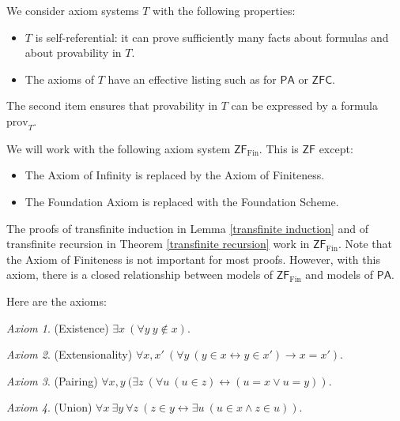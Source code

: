 \documentclass[a4paper, 11pt]{amsart}
\theoremstyle{remark}
\newtheorem*{axiom}{Axiom}
\newcommand{\axiomft}[1]{\mathsf{#1}}
\newcommand{\PA}{\axiomft{PA}}
\newcommand{\ZFC}{\axiomft{ZFC}}
\newcommand{\ZF}{\axiomft{ZF}}
\newcommand{\Fin}{\mathrm{Fin}}
\newcommand{\prov}{\mathrm{prov}}
\begin{document}
We consider axiom systems $T$ with the following properties: 
\begin{itemize} 
\item 
$T$ is self-referential: it can prove sufficiently many facts about formulas and about provability in $T$. 
\item 
The axioms of $T$ have an effective listing such as for $\PA$ or $\ZFC$. 
\end{itemize} 

The second item ensures that provability in $T$ can be expressed by a formula $\prov_T$. 

We will work with the following axiom system $\ZF_{\Fin}$. 
This is $\ZF$ except: 
\begin{itemize} 
\item 
The Axiom of Infinity is replaced by the Axiom of Finiteness. 
\item 
{}
The Foundation Axiom is replaced with the Foundation Scheme. 
\end{itemize} 

The proofs of transfinite induction in Lemma \ref{transfinite induction} and of transfinite recursion in Theorem \ref{transfinite recursion} work in $\ZF_{\Fin}$. 
Note that the Axiom of Finiteness is not important for most proofs. 
However, with this axiom, there is a closed relationship between models of $\ZF_{\Fin}$ and models of $\PA$. 

Here are the axioms: 

\begin{axiom}(Existence) 
$\exists x\ (\forall y\ y\notin x)$. 
\end{axiom} 

\begin{axiom}(Extensionality) 
$\forall x,x'\ (\forall y\ (y\in x\leftrightarrow y\in x') \rightarrow x=x')$. 
\end{axiom} 

\begin{axiom}(Pairing) 
$\forall x,y\ (\exists z\ (\forall u\ (u\in z) \leftrightarrow (u=x\vee u=y))$. 
\end{axiom} 

\begin{axiom}(Union) 
$\forall x\ \exists y\ \forall z\ (z\in y \leftrightarrow \exists u\ (u\in x \wedge z\in u))$. 
\end{axiom} 
\end{document}
